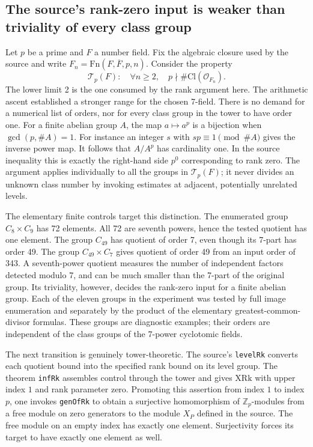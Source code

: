 \documentclass[12pt,letterpaper]{article}
\begin{document}
\subsection{The source's rank-zero input is weaker than triviality of every class group}

Let \(p\) be a prime and \(F\) a number field. Fix the algebraic closure used by the source and write \(F_n=\mathrm{Fn}(F,\overline F,p,n)\). Consider the property
\[
 \mathcal T_p(F):\quad \forall n\ge2,\quad p\nmid\#\mathrm{Cl}(\mathcal O_{F_n}).
\]
The lower limit 2 is the one consumed by the rank argument here. The arithmetic ascent established a stronger range for the chosen 7-field. There is no demand for a numerical list of orders, nor for every class group in the tower to have order one. For a finite abelian group \(A\), the map \(a\mapsto a^p\) is a bijection when \(\gcd(p,\#A)=1\). For instance an integer \(s\) with \(sp\equiv1\pmod{\#A}\) gives the inverse power map. It follows that \(A/A^p\) has cardinality one. In the source inequality this is exactly the right-hand side \(p^0\) corresponding to rank zero. The argument applies individually to all the groups in \(\mathcal T_p(F)\); it never divides an unknown class number by invoking estimates at adjacent, potentially unrelated levels.

The elementary finite controls target this distinction. The enumerated group \(C_8\times C_9\) has 72 elements. All 72 are seventh powers, hence the tested quotient has one element. The group \(C_{49}\) has quotient of order 7, even though its 7-part has order 49. The group \(C_{49}\times C_7\) gives quotient of order 49 from an input order of 343. A seventh-power quotient measures the number of independent factors detected modulo 7, and can be much smaller than the 7-part of the original group. Its triviality, however, decides the rank-zero input for a finite abelian group. Each of the eleven groups in the experiment was tested by full image enumeration and separately by the product of the elementary greatest-common-divisor formulas. These groups are diagnostic examples; their orders are independent of the class groups of the 7-power cyclotomic fields.

The next transition is genuinely tower-theoretic. The source's \texttt{levelRk} converts each quotient bound into the specified rank bound on its level group. The theorem \texttt{infRk} assembles control through the tower and gives \(\mathrm{XRk}\) with upper index \(1\) and rank parameter zero. Promoting this assertion from index \(1\) to index \(p\), one invokes \texttt{genOfRk} to obtain a surjective homomorphism of \(\mathbb Z_p\)-modules from a free module on zero generators to the module \(X_P\) defined in the source. The free module on an empty index has exactly one element. Surjectivity forces its target to have exactly one element as well.
\end{document}
